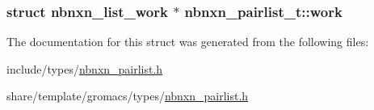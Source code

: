 \hypertarget{structnbnxn__pairlist__t_a5edb3fd3a8ca19ec7718afd7acc24a6a}{
\subsubsection[{work}]{\setlength{\rightskip}{0pt plus 5cm}struct {\bf nbnxn\-\_\-list\-\_\-work} $\ast$ {\bf nbnxn\-\_\-pairlist\-\_\-t\-::work}}}\label{structnbnxn__pairlist__t_a5edb3fd3a8ca19ec7718afd7acc24a6a}


\-The documentation for this struct was generated from the following files\-:\begin{DoxyCompactItemize}
\item 
include/types/\hyperlink{include_2types_2nbnxn__pairlist_8h}{nbnxn\-\_\-pairlist.\-h}\item 
share/template/gromacs/types/\hyperlink{share_2template_2gromacs_2types_2nbnxn__pairlist_8h}{nbnxn\-\_\-pairlist.\-h}\end{DoxyCompactItemize}
